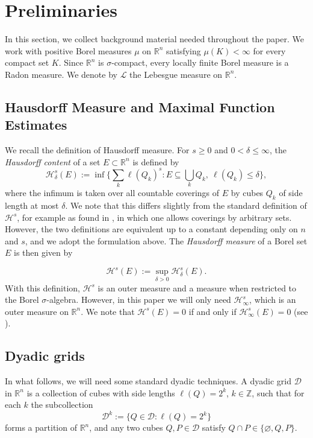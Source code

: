 \documentclass[11pt, a4paper, reqno]{amsart}
\newcommand{\R}{\mathbb R}
\newcommand{\Z}{\mathbb Z}
\newcommand{\Dy}{\mathscr D}
\newcommand{\Haus}{\mathcal H }
\theoremstyle{definition}
\theoremstyle{remark}
\begin{document}
\section{Preliminaries}\label{prelim}

In this section, we collect background material needed throughout the paper. We work with positive Borel measures $\mu$ on $\R^n$ satisfying $\mu(K)<\infty$ for every compact set $K$. Since $\R^n$ is $\sigma$-compact, every locally finite Borel measure is a Radon measure. We denote by $\mathcal L$ the Lebesgue measure on $\R^n$.  

\subsection{Hausdorff Measure and Maximal Function Estimates}

We recall the definition of Hausdorff measure. For $s\ge 0$ and $0<\delta\le\infty$,
the \emph{Hausdorff content} of a set $E\subset\R^n$ is defined by
\[
\Haus^s_\delta(E)
:= \inf\Biggl\{\sum_k \ell(Q_k)^s
: E\subseteq\bigcup_k Q_k,\ \ell(Q_k)\le\delta\Biggr\},
\]
where the infimum is taken over all countable coverings of $E$ by cubes $Q_k$ of
side length at most $\delta$. We note that this differs slightly from the standard definition of $\Haus^s$, for example as found in \cite{EG}, in which one allows coverings by arbitrary sets. However, the two definitions are equivalent up to a constant depending only on $n$ and $s$, and we adopt the formulation above. The \emph{Hausdorff measure} of a Borel set $E$ is
then given by

\[
\Haus^s(E):=\sup_{\delta>0}\Haus^s_\delta(E).
\]
With this definition, $\Haus^s$ is an outer measure and a measure when restricted to the Borel $\sigma$-algebra. However, in this paper we will only need $\Haus^s_\infty$, which is an outer measure on $\R^n$. We note that $\Haus^s(E)=0$ if and only if $\Haus^s_\infty(E)=0$ (see \cite[p. 64]{EG}).

\subsection{Dyadic grids}


In what follows, we will need some standard dyadic techniques.  A dyadic grid $\Dy$ in $\R^n$ is a collection of cubes with side lengths $\ell(Q)=2^k$, $k\in\Z$, such that for each $k$ the subcollection
\[
\Dy^k := \{Q\in\Dy : \ell(Q)=2^k\}
\]
forms a partition of $\R^n$, and any two cubes $Q,P\in\Dy$ satisfy $Q\cap P\in\{\varnothing,Q,P\}$.
\end{document}
